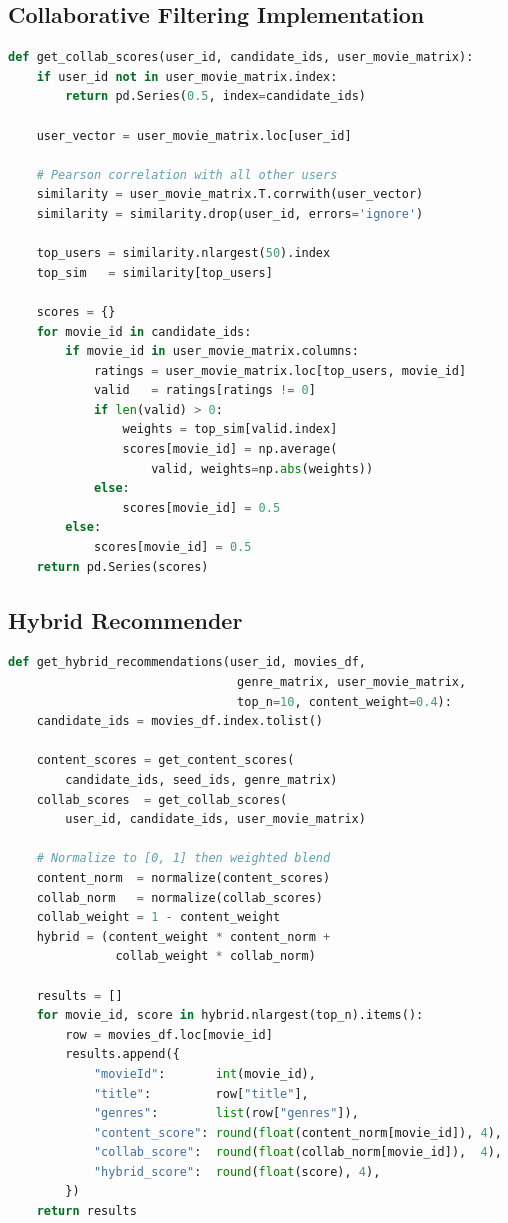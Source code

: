 \documentclass[12pt,a4paper]{report}
\begin{document}
\subsection{Collaborative Filtering Implementation}

\begin{lstlisting}[language=Python, caption={Collaborative Filtering Implementation}]
def get_collab_scores(user_id, candidate_ids, user_movie_matrix):
    if user_id not in user_movie_matrix.index:
        return pd.Series(0.5, index=candidate_ids)

    user_vector = user_movie_matrix.loc[user_id]

    # Pearson correlation with all other users
    similarity = user_movie_matrix.T.corrwith(user_vector)
    similarity = similarity.drop(user_id, errors='ignore')

    top_users = similarity.nlargest(50).index
    top_sim   = similarity[top_users]

    scores = {}
    for movie_id in candidate_ids:
        if movie_id in user_movie_matrix.columns:
            ratings = user_movie_matrix.loc[top_users, movie_id]
            valid   = ratings[ratings != 0]
            if len(valid) > 0:
                weights = top_sim[valid.index]
                scores[movie_id] = np.average(
                    valid, weights=np.abs(weights))
            else:
                scores[movie_id] = 0.5
        else:
            scores[movie_id] = 0.5
    return pd.Series(scores)
\end{lstlisting}

\subsection{Hybrid Recommender}

\begin{lstlisting}[language=Python, caption={Hybrid Recommendation Engine}]
def get_hybrid_recommendations(user_id, movies_df,
                                genre_matrix, user_movie_matrix,
                                top_n=10, content_weight=0.4):
    candidate_ids = movies_df.index.tolist()

    content_scores = get_content_scores(
        candidate_ids, seed_ids, genre_matrix)
    collab_scores  = get_collab_scores(
        user_id, candidate_ids, user_movie_matrix)

    # Normalize to [0, 1] then weighted blend
    content_norm  = normalize(content_scores)
    collab_norm   = normalize(collab_scores)
    collab_weight = 1 - content_weight
    hybrid = (content_weight * content_norm +
               collab_weight * collab_norm)

    results = []
    for movie_id, score in hybrid.nlargest(top_n).items():
        row = movies_df.loc[movie_id]
        results.append({
            "movieId":       int(movie_id),
            "title":         row["title"],
            "genres":        list(row["genres"]),
            "content_score": round(float(content_norm[movie_id]), 4),
            "collab_score":  round(float(collab_norm[movie_id]),  4),
            "hybrid_score":  round(float(score), 4),
        })
    return results
\end{lstlisting}
\end{document}
